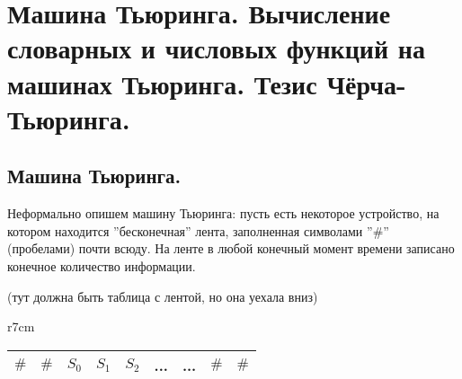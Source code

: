 \section{Машина Тьюринга. Вычисление словарных и числовых функций на машинах Тьюринга. Тезис Чёрча- Тьюринга.}
\subsection*{Машина Тьюринга.}
\par Неформально опишем машину Тьюринга: пусть есть некоторое устройство, на
котором находится ''бесконечная'' лента, заполненная символами ''$\#$''
(пробелами) почти всюду.
На ленте в любой конечный момент времени записано конечное количество информации.

(тут должна быть таблица с лентой, но она уехала вниз)

\begin{wraptable}{r}{7cm}
	\begin{tabular}{ c|c|c|c|c|c|c|c|c } 
		\hline
		$\#$ & $\#$ & $S_{0}$ & $S_{1}$ & $S_{2}$ & ... & ... & $\#$ & $\#$ \\  \hline
	\end{tabular}
	\\
\end{wraptable}

